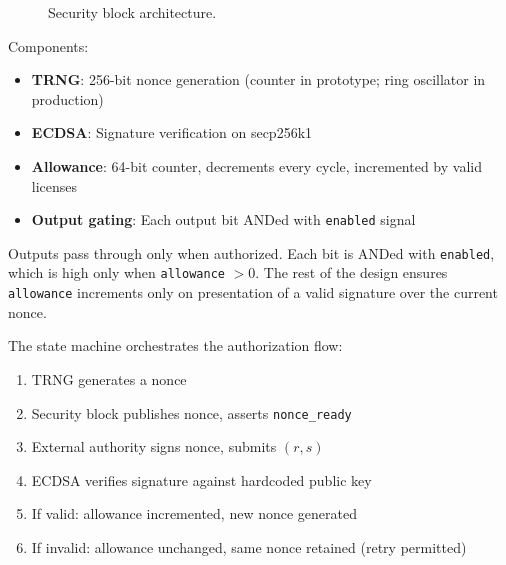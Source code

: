\documentclass[11pt]{article}
\begin{document}
\begin{figure}[h]
\begin{center}
\begin{tikzpicture}
\end{tikzpicture}
\caption{Security block architecture.}
\label{fig:architecture}
\end{center}
\end{figure}

Components:
\begin{itemize}[nosep]
    \item \textbf{TRNG}: 256-bit nonce generation (counter in prototype; ring oscillator in production)
    \item \textbf{ECDSA}: Signature verification on secp256k1
    \item \textbf{Allowance}: 64-bit counter, decrements every cycle, incremented by valid licenses
    \item \textbf{Output gating}: Each output bit ANDed with \texttt{enabled} signal
\end{itemize}

Outputs pass through only when authorized. Each bit is ANDed with \texttt{enabled}, which is high only when \texttt{allowance} $> 0$. The rest of the design ensures \texttt{allowance} increments only on presentation of a valid signature over the current nonce.

The state machine orchestrates the authorization flow:
\begin{enumerate}[nosep]
    \item TRNG generates a nonce
    \item Security block publishes nonce, asserts \texttt{nonce\_ready}
    \item External authority signs nonce, submits $(r, s)$
    \item ECDSA verifies signature against hardcoded public key
    \item If valid: allowance incremented, new nonce generated
    \item If invalid: allowance unchanged, same nonce retained (retry permitted)
\end{enumerate}
\end{document}
